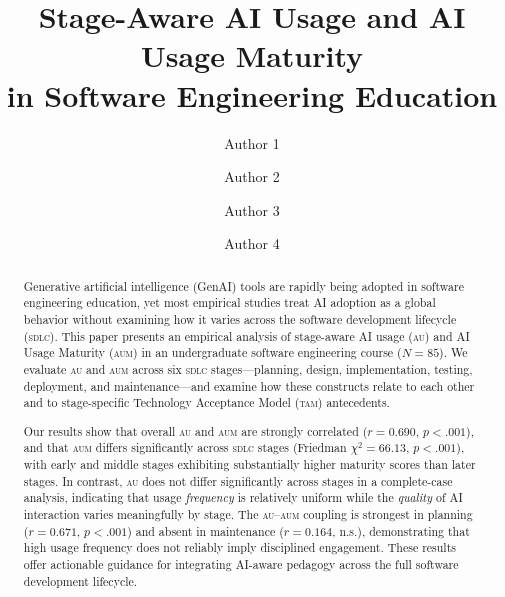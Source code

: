 \documentclass[sigconf,anonymous]{acmart}
\newcommand{\AUM}{\textsc{aum}\xspace}
\newcommand{\AU}{\textsc{au}\xspace}
\newcommand{\TAM}{\textsc{tam}\xspace}
\newcommand{\SDLC}{\textsc{sdlc}\xspace}
\begin{document}
\title{Stage-Aware AI Usage and AI Usage Maturity\\
       in Software Engineering Education}

\author{Author 1}

\author{Author 2}

\author{Author 3}

\author{Author 4}

\begin{abstract}
Generative artificial intelligence (GenAI) tools are rapidly being adopted
in software engineering education, yet most empirical studies treat AI
adoption as a global behavior without examining how it varies across the
software development lifecycle (\SDLC). This paper presents an empirical
analysis of stage-aware AI usage (\AU) and AI Usage Maturity (\AUM) in an
undergraduate software engineering course ($N = 85$). We evaluate \AU and
\AUM across six \SDLC stages---planning, design, implementation, testing,
deployment, and maintenance---and examine how these constructs relate to
each other and to stage-specific Technology Acceptance Model (\TAM)
antecedents.

Our results show that overall \AU and \AUM are strongly correlated
($r = 0.690$, $p < .001$), and that \AUM differs significantly across
\SDLC stages (Friedman $\chi^2 = 66.13$, $p < .001$), with early and
middle stages exhibiting substantially higher maturity scores than later
stages. In contrast, \AU does not differ significantly across stages in a
complete-case analysis, indicating that usage \emph{frequency} is
relatively uniform while the \emph{quality} of AI interaction varies
meaningfully by stage. The \AU--\AUM coupling is strongest in planning
($r = 0.671$, $p < .001$) and absent in maintenance ($r = 0.164$, n.s.),
demonstrating that high usage frequency does not reliably imply disciplined
engagement. These results offer actionable guidance for integrating
AI-aware pedagogy across the full software development lifecycle.
\end{abstract}
\end{document}
